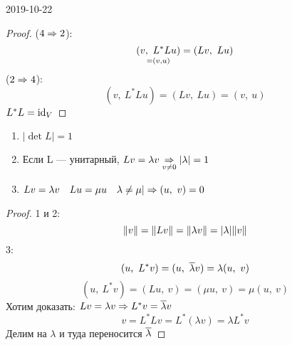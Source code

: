 \documentclass[main]{subfiles}
\begin{document}
\begin{lect} {2019-10-22}
		\begin{proof}
			($4 \Rightarrow 2$):
			\[\underset{=(v,u)}{(v,\ L^*Lu)} = (Lv,\ Lu)\]
			($2 \Rightarrow 4$):
			\[(v,\ L^* L u) = (Lv,\ Lu) = (v,\ u) \]
		    $L^*L = \mathop{\rm id}\nolimits_V$
		\end{proof}

		\begin{utv}
			\begin{enumerate}
				\item $|\det L| = 1$
				\item Если L --- унитарный, $Lv = \lambda v \underset{v \neq 0}{\Rightarrow} |\lambda| = 1$
				\item $Lv = \lambda v \quad Lu = \mu u \quad \lambda \neq \mu | \Rightarrow (u,\ v) = 0$
			\end{enumerate}
		\end{utv}

		\begin{proof}
			1 и 2:
			\[\lVert v \rVert = \lVert Lv \rVert = \lVert \lambda v \rVert = |\lambda| \lVert v \rVert\]
			3:
			\[(u,\ L^* v) = (u,\ \ol{\lambda} v) = \lambda (u,\ v)\]
			\[(u,\ L^* v) = (Lu,\ v) = (\mu u,\ v) = \mu(u,\ v)\]
			Хотим доказать: $Lv = \lambda v \Rightarrow L^* v = \overline{\lambda} v$
			\[v = L^* L v = L^* (\lambda v) = \lambda L^* v\]
			Делим на $\lambda$ и туда переносится $\overline{\lambda}$

		\end{proof}
	\end{lect}
\end{document}
